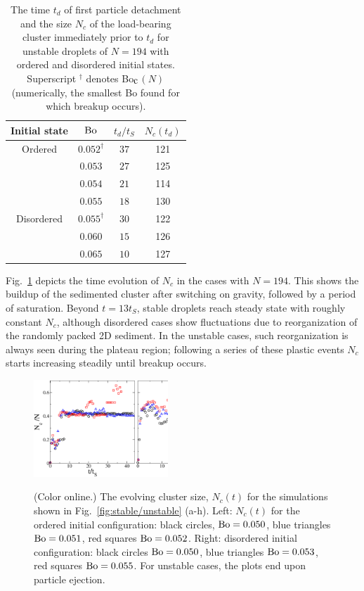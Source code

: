 \documentclass[aps,prl,superscriptaddress,twocolumn,showpacs,floatfix]{revtex4-1}
\newcommand{\Bocm}{Bo$_{\hbox{\rm c}}$}
\begin{document}
\begin{table}
\begin{center}
\begin{tabular}{c c c c }
\hline\hline
Initial state & $\rm Bo$    & $t_{d}/t_S$ & $N_{c}(t_d)$ \\ \hline
Ordered         & $0.052^\dag$ & $37$  & 121 \\
              & $0.053$ & $27$  & 125 \\
              & $0.054$ & $21$   & 114 \\ 
              & $0.055$ & $18$   & 130 \\ \hline
Disordered      & $0.055^\dag$ & $30$   & 122 \\ 
              & $0.060$ & $15$   & 126 \\
              & $0.065$ & $10$   & 127 \\ \hline
        
\end{tabular}   
\caption[smallcaption]{The time $t_{d}$ of first particle detachment and the size $N_{c}$ of the load-bearing cluster immediately prior to $t_d$ for unstable droplets of $N=194$ with ordered and disordered initial states. Superscript $^\dag$ denotes \Bocm $(N)$ (numerically, the smallest Bo found for which breakup occurs).}
\label{table:N194unstable}
\end{center}
\end{table}

Fig.~\ref{fig:Ncluster} depicts the time evolution of $N_{c}$ in the cases with $N=194$. This shows the buildup of the sedimented cluster after switching on gravity, followed by a period of saturation. Beyond $t=13t_S$, stable droplets reach steady state with roughly constant $N_{c}$, although disordered cases show fluctuations due to reorganization of the randomly packed 2D sediment. In the unstable cases, such reorganization is always seen during the plateau region; following a series of these plastic events $N_{c}$ starts increasing steadily until breakup occurs.



\begin{figure}[tbph]
\centering
\vspace{.15in}
{\includegraphics[width=0.45\textwidth]{figure2_ks.eps}}
\caption{(Color online.) The evolving cluster size, $N_{c}(t)$ for the simulations shown in Fig.~\ref{fig:stable/unstable} (a-h).  Left: $N_{c}(t)$ for the ordered initial configuration: black circles, $\rm Bo=0.050$, blue triangles $\rm Bo=0.051$, red squares $\rm Bo=0.052$. Right:  disordered initial configuration: black circles  $\rm Bo=0.050$, blue triangles $\rm Bo=0.053$, red squares $\rm Bo=0.055$. For unstable cases, the plots end upon particle ejection.}
\label{fig:Ncluster}
\end{figure}
\end{document}
